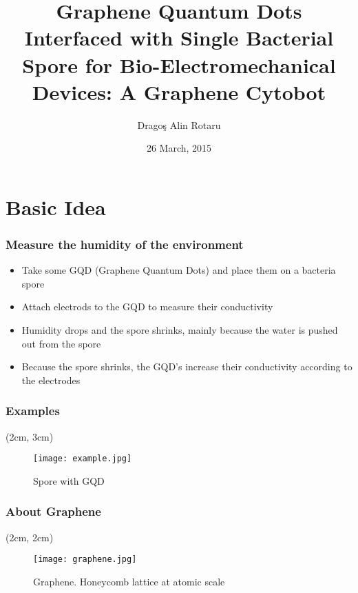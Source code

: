 \documentclass{beamer}
\title[University of Bucharest]{Graphene Quantum Dots Interfaced with Single Bacterial Spore for Bio-Electromechanical Devices: A Graphene Cytobot}
\author[Drago\c{s} Alin Rotaru]{Drago\c{s} Alin Rotaru} %
\institute[UniBuc] %
{
University of Bucharest\\ %
}
\date{26 March, 2015} %
\begin{document}
\begin{frame}
\titlepage %
\end{frame}



\section{Basic Idea} %

\begin{frame}
    \frametitle{Measure the humidity of the environment} %
    \begin{itemize}
        \item Take some GQD (Graphene Quantum Dots) and place them on a bacteria spore
        \pause
        \item Attach electrods to the GQD to measure their conductivity
        \pause
        \item Humidity drops and the spore shrinks, mainly because the water is pushed out from the spore
        \pause
        \item Because the spore shrinks, the GQD's increase their conductivity according to the electrodes
    \end{itemize}
\end{frame}

\begin{frame}
    \frametitle{Examples}
    \begin{textblock*}{5cm}(2cm, 3cm)
        \begin{figure}
            \texttt{[image: example.jpg]}
            \caption{Spore with GQD}
        \end{figure}
    \end{textblock*}
\end{frame}

\begin{frame}
    \frametitle{About Graphene}
    \begin{textblock*}{8cm}(2cm, 2cm)
        \begin{figure}
            \texttt{[image: graphene.jpg]}
            \caption{Graphene. Honeycomb lattice at atomic scale}
        \end{figure}
    \end{textblock*}
\end{frame}
\end{document}
